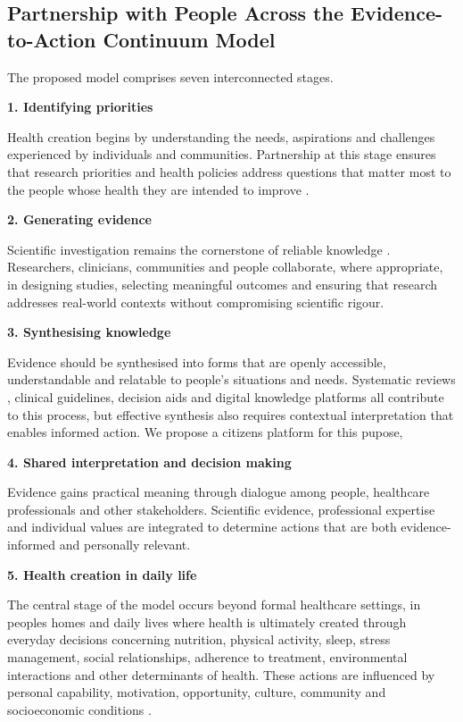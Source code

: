 \documentclass{article}
\begin{document}
\subsection{Partnership with People Across the Evidence-to-Action Continuum Model}
\label{sec:orgc441b3c}

The proposed model comprises seven interconnected stages.

\textbf{\textbf{1. Identifying priorities}}

Health creation begins by understanding the needs, aspirations and challenges experienced by individuals and communities. Partnership at this stage ensures that research priorities and health policies address questions that matter most to the people whose health they are intended to improve \cite{Marmot2012}.

\textbf{\textbf{2. Generating evidence}}

Scientific investigation remains the cornerstone of reliable knowledge \cite{Sackett1996}. Researchers, clinicians, communities and people collaborate, where appropriate, in designing studies, selecting meaningful outcomes \cite{Elwyn2012} and ensuring that research addresses real-world contexts without compromising scientific rigour.

\textbf{\textbf{3. Synthesising knowledge}}

Evidence should be synthesised into forms that are openly accessible, understandable and relatable to people's situations and needs. Systematic reviews \cite{Straus2013} \cite{Greenhalgh2011}, clinical guidelines, decision aids and digital knowledge platforms all contribute to this process, but effective synthesis also requires contextual interpretation that enables informed action. We propose a citizens platform for this pupose,

\textbf{\textbf{4. Shared interpretation and decision making}}

Evidence gains practical meaning through dialogue among people, healthcare professionals and other stakeholders. Scientific evidence, professional expertise and individual values are integrated \cite{Elwyn2012} to determine actions that are both evidence-informed and personally relevant.

\textbf{\textbf{5. Health creation in daily life}}

The central stage of the model occurs beyond formal healthcare settings, in peoples homes and daily lives where health is ultimately created through everyday decisions \cite{Egger2017} \cite{WHO2025} concerning nutrition, physical activity, sleep, stress management, social relationships, adherence to treatment, environmental interactions and other determinants of health. These actions are influenced by personal capability, motivation, opportunity, culture, community and socioeconomic conditions \cite{Michie2011}.
\end{document}
